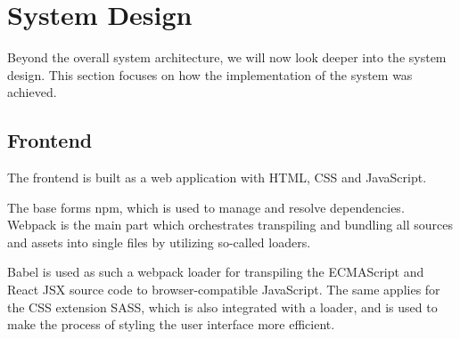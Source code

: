 \documentclass[a4paper,top=25mm,bottom=25mm,12pt,pdftex,halfparskip,twoside,bibtotoc,numbers=noenddot]{scrbook}
\begin{document}
\todo[inline]{}




\section{System Design}


Beyond the overall system architecture, we will now look deeper into the system design.
This  section  focuses on how the implementation of the system was achieved.

\subsection{Frontend}


The frontend is built as a web application with HTML, CSS and JavaScript.

The base forms npm, which is used to manage and resolve dependencies.  Webpack is the main part which orchestrates transpiling and bundling all sources and assets into single files by utilizing so-called loaders.

Babel is used as such a webpack loader for transpiling the ECMAScript and React JSX source code to browser-compatible JavaScript.
The same applies for the CSS extension SASS, which is also integrated with a loader, and is used to make the process of styling the user interface more efficient.
\end{document}
